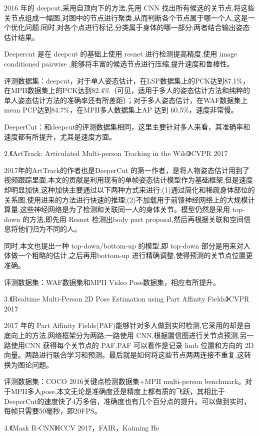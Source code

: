 \documentclass[11pt]{article}
\begin{document}
2016 年的 deepcut,采用自顶向下的方法,先用 CNN 找出所有候选的关节点,将这些关节点组成一幅图,对图中的节点进行聚类,从而判断各个节点属于哪一个人,这是一个优化问题;同时,对各个点进行标记,分类属于身体的哪一部分;两者结合输出姿态估计结果。

Deepercut 是在 deepcut 的基础上使用 resnet 进行检测提高精度,使用 image conditioned pairwise ,能够将丰富的候选节点进行压缩,提升速度和鲁棒性。

评测数据集：deepcut，对于单人姿态估计，在LSP数据集上的PCK达到87.1\%，在MPII数据集上的PCK达到82.4\%（可见，适用于多人的姿态估计方法和纯粹的单人姿态估计方法的准确率还有所差距）；对于多人姿态估计，在WAF数据集上mean PCP达到84.7\%，在MPII多人数据集上AP 达到 60.5\%，速度非常慢。

DeeperCut：和deepcut的评测数据集相同，这里主要针对多人来看，其准确率和速度都有所提升，尤其是速度方面。

2.《ArtTrack: Articulated Multi-person Tracking in the Wild》CVPR 2017

2017年的ArtTrack的作者也是DeeperCut 的第一作者，是将人物姿态估计用到了视频跟踪里面,本文的贡献是利用现有的单帧姿态估计模型作为基础框架,但是速度却明显加快,这种加快主要通过以下两种方式来进行:(1)通过简化和稀疏身体部位的关系图,使用进来的方法进行快速的推理;(2)不加载用于前馈神经网络上的大规模计算量,这些神经网络是为了检测和关联同一人的身体关节。模型仍然是采用 top-down 的方法,即先用 Resnet 检测出body part proposal,然后再根据关联和空间信息将他们归为不同的人。

同时,本文也提出一种 top-down/bottom-up 的模型,即 top-down 部分是用来对人体做一个粗略的估计,之后再用bottom-up 进行精确调整,使得预测的关节点位置更准确。

评测数据集：WAF数据集和MPII Video Pose数据集，相应有所提升。

3.《Realtime Multi-Person 2D Pose Estimation using Part Affinity Fields》CVPR 2017

2017 年的 Part Affinity Fields(PAF)能够针对多人做到实时检测,它采用的却是自底向上的方法,网络框架分为两路;一路使用 CNN,根据置信图进行关节点预测,另一路使用CNN 获得每个关节点的 PAF,PAF 可以看作是记录 limb 位置和方向的 2D 向量。两路进行联合学习和预测。最后就是如何将这些节点两两连接不重复,这转换为图论问题。

评测数据集：COCO 2016关键点检测数据集+MPII multi-person benchmark。对于MPII多人pose,本文无论是准确度还是精度上都有质的飞跃，其相比于DeeperCut的速度快了4万多倍，准确度也有几个百分点的提升。可以做到实时，每帧只需要50毫秒，即20FPS。

4.《Mask R-CNN》ICCV 2017，FAIR，Kaiming He
\end{document}
